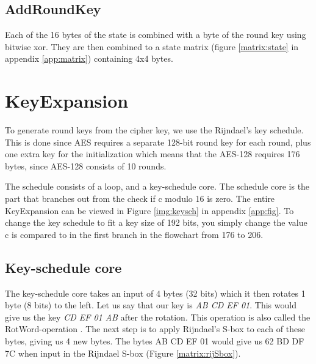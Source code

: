 
\subsection{AddRoundKey}
Each of the 16 bytes of the state is combined with a byte of the round key 
using bitwise xor. They are then combined to a state matrix (figure 
\ref{matrix:state} in appendix \ref{app:matrix}) containing 4x4 bytes.

\section{KeyExpansion}\label{sec:KeySch}
To generate round keys from the cipher key, we use the Rijndael's key schedule. 
This is done since AES requires a separate 128-bit round key for each round, 
plus one extra key for the initialization which means that the AES-128 requires 
176 bytes, since AES-128 consists of 10 rounds. 


The schedule consists of a loop, and a key-schedule core. The schedule core is 
the part that branches out from the check if c modulo 16 is zero. The entire 
KeyExpansion can be viewed in Figure \ref{img:keysch} in appendix \ref{app:fig}. 
To change the key schedule to fit a key size of 192 bits, you simply change the 
value c is compared to in the first branch in the flowchart from 176 to 206. 

\subsection{Key-schedule core}\label{sec:kCore}
The key-schedule core takes an input of 4 bytes (32 bits) which it then rotates 
1 byte (8 bits) to the left. Let us say that our key is \emph{AB CD EF 01}. This 
would give us the key \emph{CD EF 01 AB} after the rotation. This operation is 
also called the RotWord-operation \citep[p. 107]{Stinson:2006}. The next step is 
to apply Rijndael's S-box to each of these bytes, giving us 4 new bytes. The 
bytes {AB CD EF 01} would give us {62 BD DF 7C} when input in the Rijndael 
S-box (Figure \ref{matrix:rijSbox}).

